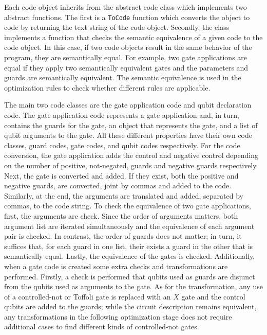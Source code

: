 Each code object inherits from the abstract code class which implements two abstract functions. The first is a \texttt{ToCode} function which converts the object to code by returning the text string of the code object. Secondly, the class implements a function that checks the semantic equivalence of a given code to the code object. In this case, if two code objects result in the same behavior of the program, they are semantically equal. For example, two gate applications are equal if they apply two semantically equivalent gates and the parameters and guards are semantically equivalent. The semantic equivalence is used in the optimization rules to check whether different rules are applicable.

The main two code classes are the gate application code and qubit declaration code. The gate application code represents a gate application and, in turn, contains the guards for the gate, an object that represents the gate, and a list of qubit arguments to the gate. All these different properties have their own code classes, guard codes, gate codes, and qubit codes respectively. For the code conversion, the gate application adds the control and negative control depending on the number of positive, \ie not-negated, guards and negative guards respectively. Next, the gate is converted and added. If they exist, both the positive and negative guards, are converted, joint by commas and added to the code. Similarly, at the end, the arguments are translated and added, separated by commas, to the code string. To check the equivalence of two gate applications, first, the arguments are check. Since the order of arguments matters, both argument list are iterated simultaneously and the equivalence of each argument pair is checked. In contrast, the order of guards does not matter; in turn, it suffices that, for each guard in one list, their exists a guard in the other that is semantically equal. Lastly, the equivalence of the gates is checked. 
Additionally, when a gate code is created some extra checks and transformations are performed. Firstly, a check is performed that qubits used as guards are disjunct from the qubits used as arguments to the gate. As for the transformation, any use of a controlled-not or Toffoli gate is replaced with an $X$ gate and the control qubits are added to the guards; while the circuit description remains equivalent, any transformations in the following optimization stage does not require additional cases to find different kinds of controlled-not gates.  

